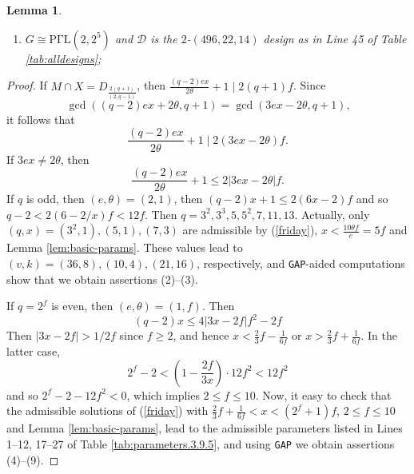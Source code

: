 \documentclass[a4paper,twopage,reqno,12pt]{amsart}
\newtheorem{lemma}[theorem]{Lemma}
\theoremstyle{definition}
\numberwithin{equation}{section}
\newcommand{\PGaL}{\mathrm{P\Gamma L}}
\renewcommand{\leq}{\leqslant}
\begin{document}
\begin{lemma}
\begin{enumerate}
\begin{enumerate}
        \item $\mathcal{D}$ is the $2$-$(120,8,8)$ design as in Line 43 of Table \ref{tab:alldesigns};
    \end{enumerate}
    \item $G\cong \PGaL(2,2^5)$ and $\mathcal{D}$ is the $2$-$(496,22,14)$ design as in Line 45 of Table \ref{tab:alldesigns};
    
\end{enumerate}
\end{lemma}

\begin{proof}
If $M\cap X=D_{\frac{2(q+1)}{(2,q-1)}}$, then $\frac{\left( q-2\right) ex}{2\theta }%
+1\mid 2(q+1)f$. Since 
\[
\gcd \left( \left( q-2\right) ex+2\theta ,q+1\right) =\gcd \left(
3ex-2\theta ,q+1\right) \text{,}
\]%
it follows that 
\begin{equation}\label{friday}
\frac{\left( q-2\right) ex}{2\theta }+1\mid 2(3ex-2\theta )f\text{.} 
\end{equation}
If $3ex\neq 2\theta $, then%
\[
\frac{\left( q-2\right) ex}{2\theta }+1\leq 2\left\vert 3ex-2\theta
\right\vert f\text{.}
\]%
If $q$ is odd, then $(e,\theta)=(2,1)$, then $\left( q-2\right) x+1\leq 2(6x-2)f$
and so $q-2<2\left(6-2/x\right) f<12f$. Then $q=3^{2},3^{3},5,5^{2},7,11,13$. %
Actually, only $(q,x)=(3^2,1),(5,1),(7,3)$ are admissible by (\ref{friday}), $x<\frac{10\theta f}{e}=5f$ and Lemma \ref{lem:basic-params}. These values lead to $(v,k)=(36,8),(10,4), (21,16)$, respectively, and \texttt{GAP}-aided computations show that we obtain assertions (2)--(3).

If $q=2^{f}$ is even, then $(e,\theta )=\left( 1,f\right) $. Then 
\begin{equation*}
\left( q-2\right) x \leq 4\left\vert 3x-2f\right\vert
f^{2}-2f
\end{equation*}%
Then $\left\vert 3x-2f\right\vert >1/2f$ since $f\ge 2$, and
hence $x<\frac{2}{3}f-\frac{1}{6f}$ or $x>\frac{2}{3}f+\frac{1}{6f}$. In the latter case,%
\[
2^{f}-2 < \left( 1-\frac{2f}{3x}\right) \cdot 12f^{2}<12f^{2}
\]
and so $2^{f}-2-12f^{2}<0$, which implies $2 \leq f \leq 10$. Now, it easy to check that the admissible solutions of (\ref{friday}) with $\frac{2}{3}f+\frac{1}{6f}<x<\left(2^{f}+1\right)f$, $2 \leq f\leq 10$ and Lemma \ref{lem:basic-params}, lead to the admissible parameters listed in Lines 1--12, 17--27 of Table \ref{tab:parameters.3.9.5}, and using \texttt{GAP} we obtain assertions (4)--(9).



\end{proof}
\end{document}
